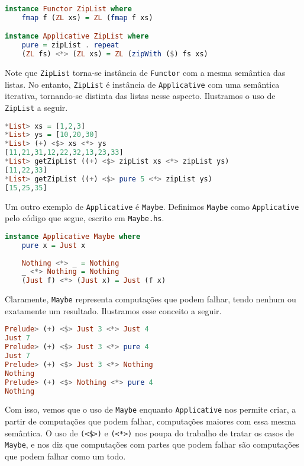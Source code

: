 \documentclass[a4paper]{article}
\begin{document}
\begin{lstlisting}[language=haskell, frame=single]
instance Functor ZipList where
	fmap f (ZL xs) = ZL (fmap f xs)

instance Applicative ZipList where
	pure = zipList . repeat
	(ZL fs) <*> (ZL xs) = ZL (zipWith ($) fs xs)
\end{lstlisting}

Note que \texttt{ZipList} torna-se instância de \texttt{Functor} com a mesma semântica das listas.
No entanto, \texttt{ZipList} é instância de \texttt{Applicative} com uma semântica iterativa, tornando-se distinta das listas nesse aspecto.
Ilustramos o uso de \texttt{ZipList} a seguir.

\begin{lstlisting}[language=haskell, frame=single]
*List> xs = [1,2,3]
*List> ys = [10,20,30]
*List> (+) <$> xs <*> ys
[11,21,31,12,22,32,13,23,33]
*List> getZipList ((+) <$> zipList xs <*> zipList ys)
[11,22,33]
*List> getZipList ((+) <$> pure 5 <*> zipList ys)
[15,25,35]
\end{lstlisting}

Um outro exemplo de \texttt{Applicative} é \texttt{Maybe}.
Definimos \texttt{Maybe} como \texttt{Applicative} pelo código que segue, escrito em \texttt{Maybe.hs}.

\begin{lstlisting}[language=haskell, frame=single]
instance Applicative Maybe where
	pure x = Just x
	
	Nothing <*> _ = Nothing
	_ <*> Nothing = Nothing
	(Just f) <*> (Just x) = Just (f x)
\end{lstlisting}

Claramente, \texttt{Maybe} representa computações que podem falhar, tendo nenhum ou exatamente um resultado.
Ilustramos esse conceito a seguir.

\begin{lstlisting}[language=haskell, frame=single]
Prelude> (+) <$> Just 3 <*> Just 4
Just 7
Prelude> (+) <$> Just 3 <*> pure 4
Just 7
Prelude> (+) <$> Just 3 <*> Nothing
Nothing
Prelude> (+) <$> Nothing <*> pure 4
Nothing
\end{lstlisting}

Com isso, vemos que o uso de \texttt{Maybe} enquanto \texttt{Applicative} nos permite criar, a partir de computações que podem falhar, computações maiores com essa mesma semântica.
O uso de \texttt{(<\$>)} e \texttt{(<*>)} nos poupa do trabalho de tratar os casos de \texttt{Maybe}, e nos diz que computações com partes que podem falhar são computações que podem falhar como um todo.
\end{document}
